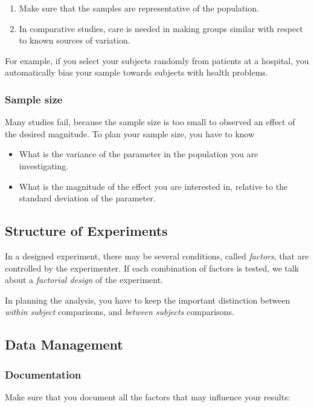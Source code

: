 \begin{enumerate}
  \item Make sure that the samples are representative of the population.
  \item In comparative studies, care is needed in making groups similar with respect to known sources of variation.
\end{enumerate}

For example, if you select your subjects randomly from patients at a hospital, you automatically bias your sample towards subjects with health problems.

\subsubsection{Sample size}
Many studies fail, because the sample size is too small to observed an effect of the desired magnitude. To plan your sample size, you have to know
\begin{itemize}
  \item What is the variance of the parameter in the population you are investigating.
  \item What is the magnitude of the effect you are interested in, relative to the standard deviation of the parameter.
\end{itemize}

\subsection{Structure of Experiments}


In a designed experiment, there may be several conditions, called \emph{factors}, that are controlled by the experimenter. If each combination of factors is tested, we talk about a \emph{factorial design} of the experiment.

In planning the analysis, you have to keep the important distinction between \emph{within subject} comparisons, and \emph{between subjects} comparisons.


\subsection{Data Management}

\subsubsection{Documentation} 
Make sure that you document all the factors that may influence your results:

